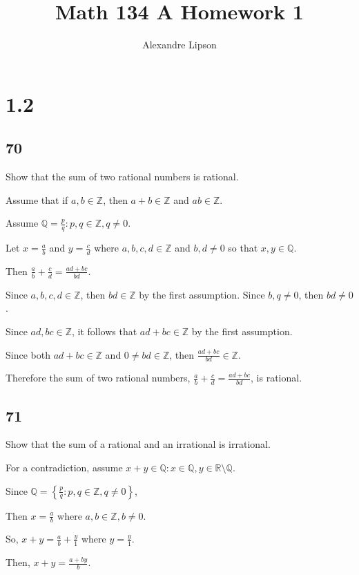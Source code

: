 \documentclass{article}
\title{Math 134 A Homework 1}
\author{Alexandre Lipson}
\begin{document}
\maketitle

\section*{1.2}

\subsection*{70}
Show that the sum of two rational numbers is rational.

Assume that if $a,b \in \mathbb{Z}$, then $a + b \in \mathbb{Z}$ and $ab \in \mathbb{Z}$.

Assume $\mathbb{Q} = \frac{p}{q} : p,q \in \mathbb{Z}, q \neq 0$.

Let $x = \frac{a}{b}$ and $y = \frac{c}{d}$ where $a,b,c,d \in \mathbb{Z}$ and $b,d \neq 0$ so that $x, y \in \mathbb{Q}$.

Then $\frac{a}{b} + \frac{c}{d} = \frac{ad + bc}{bd}$.

Since $a,b,c,d \in \mathbb{Z}$, then $bd \in \mathbb{Z}$ by the first assumption.
Since $b,q \neq 0$, then $bd \neq 0$.

Since $ad,bc \in \mathbb{Z}$, it follows that $ad + bc \in \mathbb{Z}$ by the first assumption.

Since both $ad + bc \in \mathbb{Z}$ and $0 \neq bd \in \mathbb{Z}$, then $\frac{ad + bc}{bd} \in \mathbb{Z}$.

Therefore the sum of two rational numbers, $\frac{a}{b} + \frac{c}{d} = \frac{ad + bc}{bd}$, is rational.


\subsection*{71}
Show that the sum of a rational and an irrational is irrational.

For a contradiction, assume $x + y \in \mathbb{Q} : x \in \mathbb{Q}, y \in \mathbb{R} \setminus \mathbb{Q}$.

Since $\mathbb{Q} = \left\{ \frac{p}{q} : p,q \in \mathbb{Z}, q \neq 0 \right\}$,

Then $x = \frac{a}{b}$ where $a,b \in \mathbb{Z}, b \neq 0$.

So, $x + y = \frac{a}{b} + \frac{y}{1}$ where $y = \frac{y}{1}$.

Then, $x + y = \frac{a + by}{b}$.
\end{document}
